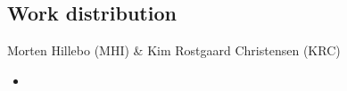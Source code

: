 \subsection{Work distribution}
Morten Hillebo (MHI) \& Kim Rostgaard Christensen (KRC)
\begin{itemize}
\item 
\end{itemize}

